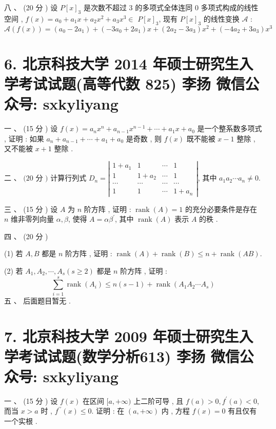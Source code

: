 \documentclass[10pt]{article}
\begin{document}
{ 八 、 (20  分 )  设  $P[x]_{3}$  是次数不超过  3  的多项式全体连同  0  多项式构成的线性空间 , $f(x)=a_{0}+a_{1} x+a_{2} x^{2}+a_{3} x^{3} \in$ $P[x]_{3}$,  现有  $P[x]_{3}$  的线性变换  $\mathscr{A}$ :
$$
\mathscr{A}(f(x))=\left(a_{0}-2 a_{1}\right)+\left(-3 a_{0}+2 a_{1}\right) x+\left(2 a_{2}-3 a_{3}\right) x^{2}+\left(-4 a_{2}+3 a_{3}\right) x^{3}
$$

\section{6. 北京科技大学 2014 年硕士研究生入学考试试题(高等代数 825) 
 李扬 
 微信公众号: sxkyliyang}
 一 、 (15  分 )  设  $f(x)=a_{n} x^{n}+a_{n-1} x^{n-1}+\cdots+a_{1} x+a_{0}$  是一个整系数多项式 ,  证明 :  如果  $a_{n}+a_{n-1}+\cdots+a_{1}+a_{0}$  是奇数 ,  则  $f(x)$  既不能被  $x-1$  整除 ,  又不能被  $x+1$  整除 .

 二 、 $(20$  分  $)$  计算行列式  $D_{n}=\left|\begin{array}{cccc}1+a_{1} & 1 & \cdots & 1 \\ 1 & 1+a_{2} & \cdots & 1 \\ \cdots & \cdots & \cdots & \cdots \\ 1 & 1 & \cdots & 1+a_{n}\end{array}\right|$,  其中  $a_{1} a_{2} \cdots a_{n} \neq 0$.

 三 、 (15  分 )  设  $A$  为  $n$  阶方阵 ,  证明 : $\operatorname{rank}(A)=1$  的充分必要条件是存在  $n$  维非零列向量  $\alpha, \beta$,  使得  $A=\alpha \beta^{\prime}$,  其中  $\operatorname{rank}(A)$  表示  $A$  的秩 .

 四 、 (20  分 )

(1)  若  $A, B$  都是  $n$  阶方阵 ,  证明 : $\operatorname{rank}(A)+\operatorname{rank}(B) \leq n+\operatorname{rank}(A B)$.

(2)  若  $A_{1}, A_{2}, \cdots, A_{s}(s \geq 2)$  都是  $n$  阶方阵 ,  证明 :
$$
\sum_{i=1}^{s} \operatorname{rank}\left(A_{i}\right) \leq n(s-1)+\operatorname{rank}\left(A_{1} A_{2} \cdots A_{s}\right)
$$
 五 、 后面题目暂无 .

\section{7. 北京科技大学 2009 年硕士研究生入学考试试题(数学分析613) 
 李扬 
 微信公众号: sxkyliyang}
 一 、 (15  分 )  设  $f(x)$  在区间  $[a,+\infty)$  上二阶可导 ,  且  $f(a)>0, f^{\prime}(a)<0$,  而当  $x>a$  时 , $f^{\prime \prime}(x) \leq 0$.  证明 :  在  $(a,+\infty)$  内 ,  方程  $f(x)=0$  有且仅有一个实根 .

}
\end{document}

